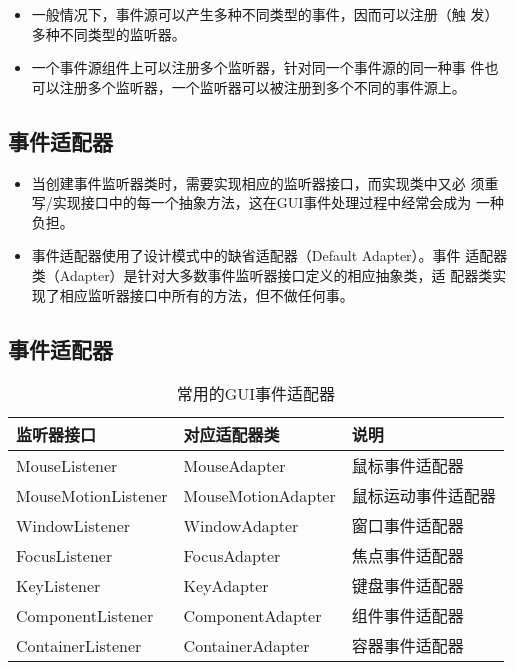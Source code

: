 \begin{itemize}
\item 一般情况下，事件源可以产生多种不同类型的事件，因而可以注册（触
  发）多种不同类型的监听器。
\item 一个事件源组件上可以注册多个监听器，针对同一个事件源的同一种事
  件也可以注册多个监听器，一个监听器可以被注册到多个不同的事件源上。
\end{itemize}


\subsection{事件适配器}

\begin{itemize}
\item 当创建事件监听器类时，需要实现相应的监听器接口，而实现类中又必
  须重写/实现接口中的每一个抽象方法，这在GUI事件处理过程中经常会成为
  一种负担。
\item 事件适配器使用了设计模式中的缺省适配器（Default Adapter）。事件
  适配器类（Adapter）是针对大多数事件监听器接口定义的相应抽象类，适
  配器类实现了相应监听器接口中所有的方法，但不做任何事。
\end{itemize}


\subsection{事件适配器}

\begin{table}[!htbp]
  \centering
  \caption{常用的GUI事件适配器}
  \label{tab:gui-events-adapter}
  \begin{tabular}{l|l|l}
    {\bf 监听器接口} & {\bf 对应适配器类} & {\bf 说明}\\
    \hline
    MouseListener & MouseAdapter & 鼠标事件适配器\\
    MouseMotionListener & MouseMotionAdapter & 鼠标运动事件适配器\\
    WindowListener & WindowAdapter & 窗口事件适配器\\
    FocusListener & FocusAdapter & 焦点事件适配器\\
    KeyListener & KeyAdapter & 键盘事件适配器\\
    ComponentListener & ComponentAdapter & 组件事件适配器\\
    ContainerListener & ContainerAdapter & 容器事件适配器\\
  \end{tabular}
\end{table}


